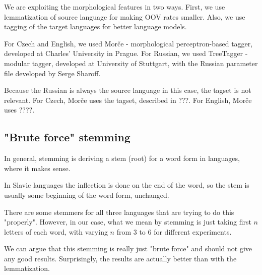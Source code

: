 \documentclass[11pt,letterpaper]{article}
\begin{document}


We are exploiting the morphological features in two ways. First, we use lemmatization of source language for making OOV rates smaller. Also, we use tagging of the target languages for better language models.

For Czech and English, we used Morče - morphological perceptron-based tagger, developed at Charles' University in Prague. For Russian, we used TreeTagger - modular tagger, developed at University of Stuttgart, with the Russian parameter file developed by Serge Sharoff.

Because the Russian is always the source language in this case, the tagset is not relevant. For Czech, Morče uses the tagset, described in ???. For English, Morče uses ????.

\subsection{"Brute force" stemming}
In general, stemming is deriving a stem (root) for a word form in languages, where it makes sense.

In Slavic languages the inflection is done on the end of the word, so the stem is usually some beginning of the word form, unchanged.

There are some stemmers for all three languages that are trying to do this "properly". However, in our case, what we mean by stemming is just taking first $n$ letters of each word, with varying $n$ from 3 to 6 for different experiments.

We can argue that this stemming is really just "brute force" and should not give any good results. Surprisingly, the results are actually better than with the lemmatization.
\end{document}
